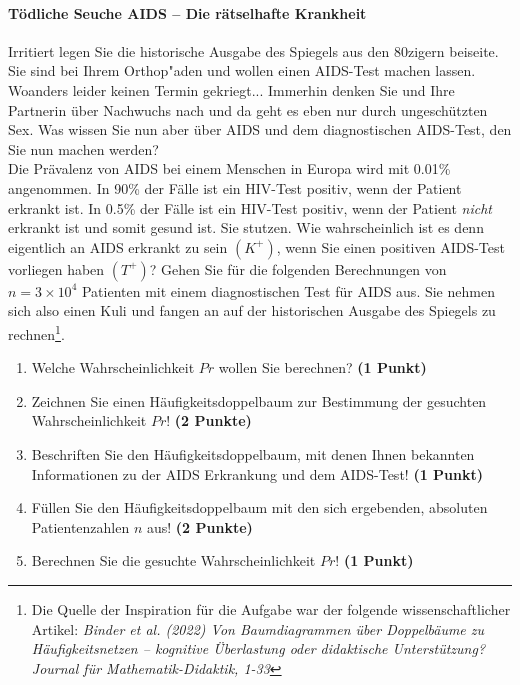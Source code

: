 \documentclass[a4paper, 9pt]{scrartcl}\usepackage[]{graphicx}\usepackage[]{xcolor}
\begin{document}
\paragraph{T{\"o}dliche Seuche AIDS -- Die r{\"a}tselhafte Krankheit}




Irritiert legen Sie die historische Ausgabe des Spiegels aus den 80zigern
beiseite. Sie sind bei Ihrem Orthop{"a}den und wollen einen AIDS-Test machen
lassen. Woanders leider keinen Termin gekriegt... Immerhin denken Sie und
Ihre Partnerin {\"u}ber Nachwuchs nach und da geht es eben nur durch
ungesch{\"u}tzten Sex. Was wissen Sie nun aber {\"u}ber AIDS und dem diagnostischen
AIDS-Test, den Sie nun machen werden?\\

Die Pr{\"a}valenz von AIDS bei einem Menschen in Europa wird mit
0.01\% angenommen. In 90\% der F{\"a}lle ist ein
HIV-Test positiv, wenn der Patient erkrankt ist. In 0.5\%
der F{\"a}lle ist ein HIV-Test positiv, wenn der Patient \textit{nicht}
erkrankt ist und somit gesund ist. Sie stutzen. Wie wahrscheinlich ist es
denn eigentlich an AIDS erkrankt zu sein $(K^+)$, wenn Sie einen positiven
AIDS-Test vorliegen haben $(T^+)$? Gehen Sie f{\"u}r die folgenden Berechnungen
von $n = \ensuremath{3\times 10^{4}}$ Patienten mit einem diagnostischen Test f{\"u}r AIDS
aus. Sie nehmen sich also einen Kuli und fangen an auf der historischen
Ausgabe des Spiegels zu rechnen\footnote{Die Quelle der Inspiration f{\"u}r die
  Aufgabe war der folgende wissenschaftlicher Artikel: \textit{Binder et
    al. (2022) Von Baumdiagrammen {\"u}ber Doppelb{\"a}ume zu H{\"a}ufigkeitsnetzen --
    kognitive {\"U}berlastung oder didaktische Unterst{\"u}tzung? Journal f{\"u}r
    Mathematik-Didaktik, 1-33}}.

\begin{enumerate}
\item Welche Wahrscheinlichkeit $Pr$ wollen Sie berechnen? \textbf{(1 Punkt)}
\item Zeichnen Sie einen H{\"a}ufigkeitsdoppelbaum zur Bestimmung der gesuchten
  Wahrscheinlichkeit $Pr$! \textbf{(2 Punkte)} 
\item Beschriften Sie den H{\"a}ufigkeitsdoppelbaum, mit denen Ihnen bekannten
  Informationen zu der AIDS Erkrankung und dem AIDS-Test! \textbf{(1 Punkt)}
\item F{\"u}llen Sie den H{\"a}ufigkeitsdoppelbaum mit den sich ergebenden,
  absoluten Patientenzahlen $n$ aus! \textbf{(2 Punkte)}
\item Berechnen Sie die gesuchte Wahrscheinlichkeit $Pr$! \textbf{(1 Punkt)}
\end{enumerate}
\end{document}
